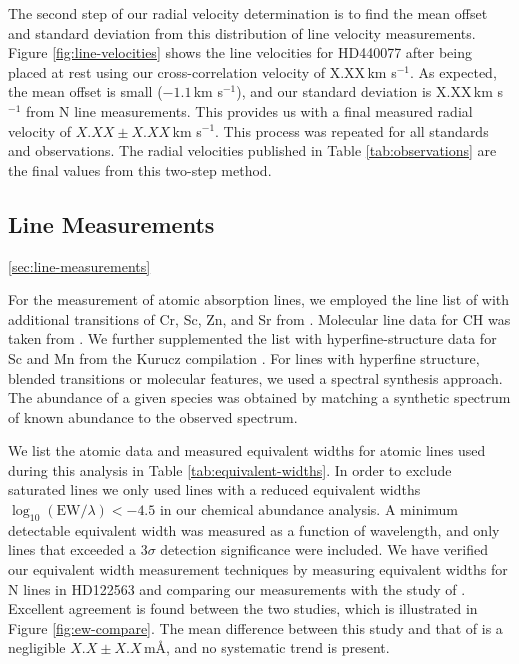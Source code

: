 \documentclass{emulateapj}
\begin{document}
The second step of our radial velocity determination is to find the mean offset and standard deviation from this distribution of line velocity measurements. Figure \ref{fig:line-velocities} shows the line velocities for HD440077 after  being placed at rest using our cross-correlation velocity of X.XX\,km s$^{-1}$. As expected, the mean offset is small ($-1.1$\,km s$^{-1}$), and our standard deviation is X.XX\,km s$^{-1}$ from N line measurements. This provides us with a final measured radial velocity of $X.XX \pm X.XX$\,km s$^{-1}$. This process was repeated for all standards and observations. The radial velocities published in Table \ref{tab:observations} are the final values from this two-step method. 

\subsection{Line Measurements}
\ref{sec:line-measurements}

For the measurement of atomic absorption lines, we employed the line list of \citet{Yong;et-al_2009} with additional transitions of Cr, Sc, Zn, and Sr from \citet{Frebel;et-al_2009}. Molecular line data for CH was taken from \citet{Plez;et-al_2008,Plez;et-al_2009}. We further supplemented the list with hyperfine-structure data for Sc and Mn  from the Kurucz compilation \citet{Kurucz;1998}. For lines with hyperfine structure, blended transitions or molecular features, we used a spectral synthesis approach. The abundance of a given species was obtained by matching a synthetic spectrum of known abundance to the observed spectrum.

We list the atomic data and measured equivalent widths for atomic lines used during this analysis in Table \ref{tab:equivalent-widths}. In order to exclude saturated lines we only used lines with a reduced equivalent widths $\log_{10}{(\mbox{EW}/\lambda)} < -4.5$ in our chemical abundance analysis. A minimum detectable equivalent width was measured as a function of wavelength, and only lines that exceeded a $3\sigma$ detection significance were included. We have verified our equivalent width measurement techniques by measuring equivalent widths for N lines in HD122563 and comparing our measurements with the study of \citet{Norris;et-al_2000}. Excellent agreement is found between the two studies, which is illustrated in Figure \ref{fig:ew-compare}. The mean difference between this study and that of \cite{Norris;et-al_2000} is a negligible $X.X \pm X.X$\,m\AA{}, and no systematic trend is present.
\end{document}
